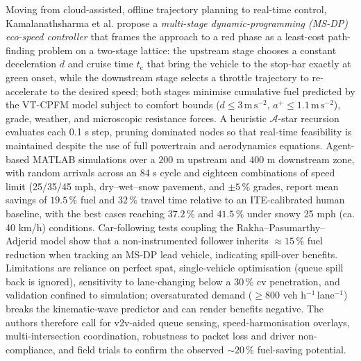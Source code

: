 Moving from cloud-assisted, offline trajectory planning to real-time control, Kamalanathsharma et al. \cite{Kamalanathsharma2013} propose a \textit{multi-stage dynamic-programming (MS-DP) eco-speed controller} that frames the approach to a red phase as a least-cost path-finding problem on a two-stage lattice: the upstream stage chooses a constant deceleration $d$ and cruise time $t_{\mathrm c}$ that bring the vehicle to the stop-bar exactly at green onset, while the downstream stage selects a throttle trajectory to re-accelerate to the desired speed; both stages minimise cumulative fuel predicted by the VT-CPFM model subject to comfort bounds ($d\le3\,\mathrm{m\,s^{-2}}$, $a^{+}\le1.1\,\mathrm{m\,s^{-2}}$), grade, weather, and microscopic resistance forces. A heuristic $\mathcal A$-star recursion evaluates each 0.1 s step, pruning dominated nodes so that real-time feasibility is maintained despite the use of full powertrain and aerodynamics equations. Agent-based MATLAB simulations over a $200$ m upstream and $400$ m downstream zone, with random arrivals across an 84 s cycle and eighteen combinations of speed limit (25/35/45 mph, dry–wet–snow pavement, and $\pm5\,\%$ grades, report mean savings of $19.5\,\%$ fuel and $32\,\%$ travel time relative to an ITE-calibrated human baseline, with the best cases reaching $37.2\,\%$ and $41.5\,\%$ under snowy 25 mph (ca. 40 km/h) conditions.  Car-following tests coupling the Rakha–Pasumarthy–Adjerid model show that a non-instrumented follower inherits \(\approx15\,\%\) fuel reduction when tracking an MS-DP lead vehicle, indicating spill-over benefits. Limitations are reliance on perfect \ac{spat}, single-vehicle optimisation (queue spill back is ignored), sensitivity to lane-changing below a 30\,\% \ac{cv} penetration, and validation confined to simulation; oversaturated demand ($\ge800$ veh h$^{-1}$\,lane$^{-1}$) breaks the kinematic-wave predictor and can render benefits negative. The authors therefore call for \ac{v2v}-aided queue sensing, speed-harmonisation overlays, multi-intersection coordination, robustness to packet loss and driver non-compliance, and field trials to confirm the observed \(\sim20\,\%\) fuel-saving potential.
\mynewline

